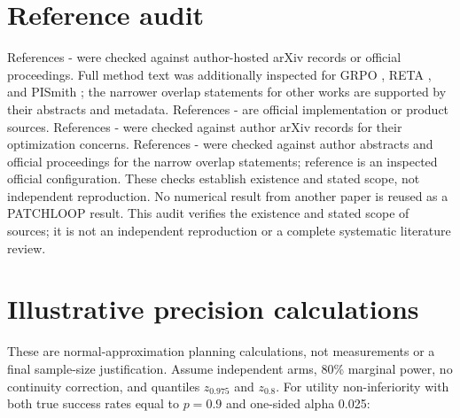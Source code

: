 \documentclass[11pt,a4paper]{article}
\begin{document}
\section{Reference audit}
References \cite{ref1}-\cite{ref12} were checked against author-hosted arXiv records or official proceedings. Full method text was additionally inspected for GRPO \cite{ref12}, RETA \cite{ref8}, and PISmith \cite{ref10}; the narrower overlap statements for other works are supported by their abstracts and metadata. References \cite{ref13}-\cite{ref15} are official implementation or product sources. References \cite{ref16}-\cite{ref17} were checked against author arXiv records for their optimization concerns. References \cite{ref18}-\cite{ref26} were checked against author abstracts and official proceedings for the narrow overlap statements; reference \cite{ref27} is an inspected official configuration. These checks establish existence and stated scope, not independent reproduction. No numerical result from another paper is reused as a PATCHLOOP result. This audit verifies the existence and stated scope of sources; it is not an independent reproduction or a complete systematic literature review.

\section{Illustrative precision calculations}
These are normal-approximation planning calculations, not measurements or a final sample-size justification. Assume independent arms, 80\% marginal power, no continuity correction, and quantiles $z_{0.975}$ and $z_{0.8}$. For utility non-inferiority with both true success rates equal to $p=0.9$ and one-sided alpha 0.025:
\end{document}
